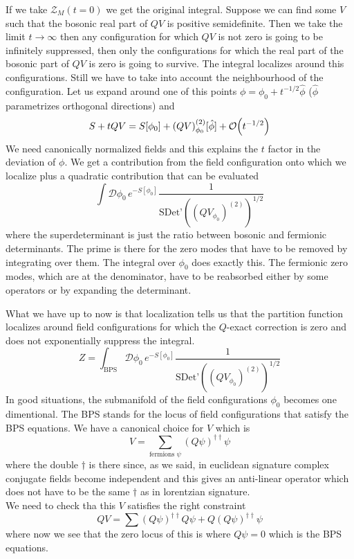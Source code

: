 \documentclass[11pt]{article}
\theoremstyle{definition}
\numberwithin{equation}{section}
\begin{document}
If we take $\mathcal{Z}_{M}(t=0)$ we get the original integral. Suppose we can find some $V$ such that the bosonic real part of $QV$ is positive semidefinite. Then we take the limit $t\rightarrow\infty$ then any configuration for which $QV$ is not zero is going to be infinitely suppressed, then only the configurations for which the real part of the bosonic part of $QV$ is zero is going to survive. The integral localizes around this configurations. Still we have to take into account the neighbourhood of the configuration. Let us expand around one of this points $\phi = \phi_{0}+t^{-1/2}\hat\phi$ ($\hat\phi$ parametrizes orthogonal directions) and 
\begin{equation}
	S+tQV = S[\phi_{0}]+(QV)^{(2)}_{\phi_{0}}[\hat\phi]+\order{t^{-1/2}}
\end{equation}
We need canonically normalized fields and this explains the $t$ factor in the deviation of $\phi$. We get a contribution from the field configuration onto which we localize plus a quadratic contribution that can be evaluated
\begin{equation}
	\int\mathcal{D}\phi_{0}\, e^{-S[\phi_{0}]}\frac{1}{\text{SDet'}((QV_{\phi_{0}})^{(2)})^{1/2}} 
\end{equation}
where the superdeterminant is just the ratio between bosonic and fermionic determinants. The prime is there for the zero modes that have to be removed by integrating over them. The integral over $\phi_{0}$ does exactly this. The fermionic zero modes, which are at the denominator, have to be reabsorbed either by some operators or by expanding the determinant.

What we have up to now is that localization tells us that the partition function localizes around field configurations for which the $Q$-exact correction is zero and does not exponentially suppress the integral.
\begin{equation}
	Z = \int_{\text{BPS}}\mathcal{D}\phi_{0}\,e^{-S[\phi_{0}]}\frac{1}{\text{SDet'}((QV_{\phi_{0}})^{(2)})^{1/2}}
\end{equation}
In good situations, the submanifold of the field configurations $\phi_{0}$ becomes one dimentional. The BPS stands for the locus of field configurations that satisfy the BPS equations. We have a canonical choice for $V$ which is
\begin{equation}
	V=\sum_{\text{fermions }\psi}(Q\psi)^{\dagger\dagger}\psi
\end{equation}
where the double $\dagger$ is there since, as we said, in euclidean signature complex conjugate fields become independent and this gives an anti-linear operator which does not have to be the same $\dagger$ as in lorentzian signature.\\
We need to check tha this $V$ satisfies the right constraint
\begin{equation}
	QV = \sum (Q\psi)^{\dagger\dagger}Q\psi+Q(Q\psi)^{\dagger\dagger}\psi
\end{equation}
where now we see that the zero locus of this is where $Q\psi=0$ which is the BPS equations.\\
\end{document}
